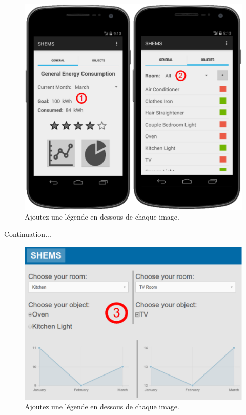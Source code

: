 \documentclass{chi-ext}
\begin{document}
\begin{figure}
  \centering
  \includegraphics[width=\linewidth]{images/mobile_goal-filter.eps}
  \caption{Ajoutez une légende en dessous de chaque image.}
  \label{fig:sample}
\end{figure}

Continuation...

\begin{figure}
  \centering
  \includegraphics[width=\linewidth]{images/web1-comparator.eps}
  \caption{Ajoutez une légende en dessous de chaque image.}
  \label{fig:sample}
\end{figure}
\end{document}
